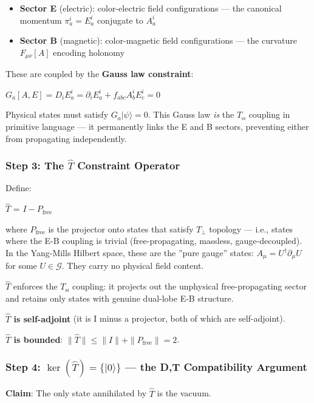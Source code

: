 \documentclass[12pt,a4paper]{article}
\begin{document}
\begin{itemize}
    \item \textbf{Sector E} (electric): color-electric field configurations --- the canonical momentum $\pi_a^i = E_a^i$ conjugate to $A_a^i$
    \item \textbf{Sector B} (magnetic): color-magnetic field configurations --- the curvature $F_{\mu\nu}[A]$ encoding holonomy
\end{itemize}

These are coupled by the \textbf{Gauss law constraint}:

$G_a[A, E]  =  D_i E_a^i  =  \partial_i E_a^i + f_{abc} A_b^i E_c^i  =  0$

Physical states must satisfy $G_a|\psi\rangle = 0$. This Gauss law \emph{is} the $T_{\bowtie}$ coupling in primitive language --- it permanently links the E and B sectors, preventing either from propagating independently.

\subsubsection{Step 3: The $\hat{T}$ Constraint Operator}

Define:

$\hat{T}$  =  $I - P_{\text{free}}$

where $P_{\text{free}}$ is the projector onto states that satisfy $T_{\perp}$ topology --- i.e., states where the E-B coupling is trivial (free-propagating, massless, gauge-decoupled). In the Yang-Mills Hilbert space, these are the ''pure gauge'' states: $A_{\mu} = U^\dagger \partial_{\mu} U$ for some $U \in \mathcal{G}$. They carry no physical field content.

$\hat{T}$ enforces the $T_{\bowtie}$ coupling: it projects out the unphysical free-propagating sector and retains only states with genuine dual-lobe E-B structure.

\textbf{$\hat{T}$ is self-adjoint} (it is I minus a projector, both of which are self-adjoint).

\textbf{$\hat{T}$ is bounded}: $\|\hat{T}\| \le \|I\| + \|P_{\text{free}}\| = 2$.

\subsubsection{Step 4: $\ker(\hat{T}) = \{|0\rangle\}$ --- the D,T Compatibility Argument}

\textbf{Claim}: The only state annihilated by $\hat{T}$ is the vacuum.
\end{document}
